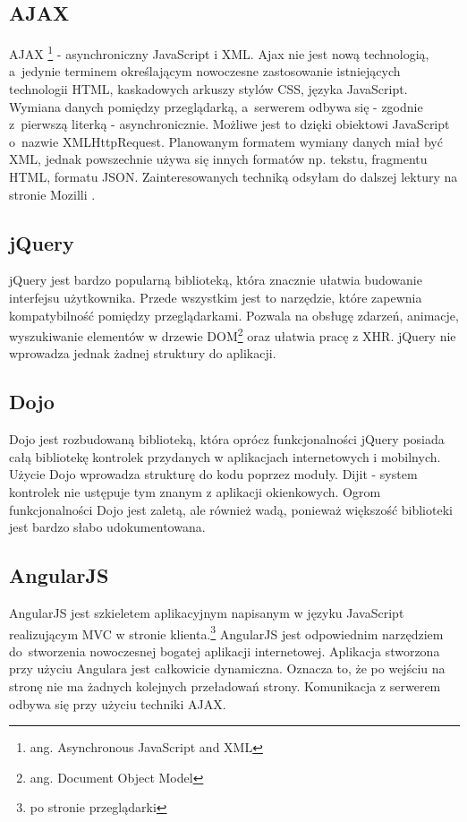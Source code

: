 \documentclass[a4paper,onecolumn,oneside,11pt,wide,floatssmall]{mwrep}
\theoremstyle{definition}
\theoremstyle{plain}%
\theoremstyle{remark}
\begin{document}
\subsection{AJAX}
AJAX \footnote{ang. Asynchronous JavaScript and XML} - asynchroniczny JavaScript i XML. Ajax nie jest nową technologią, \mbox{a jedynie} terminem określającym nowoczesne zastosowanie istniejących technologii HTML, kaskadowych arkuszy stylów CSS, języka JavaScript. Wymiana danych pomiędzy przeglądarką, \mbox{a serwerem} odbywa się - zgodnie \mbox{z pierwszą} literką - asynchronicznie. Możliwe jest to dzięki obiektowi JavaScript \mbox{o nazwie} XMLHttpRequest\cite{XmlHttpRequest}. Planowanym formatem wymiany danych miał być XML, jednak powszechnie używa się innych formatów np. tekstu, fragmentu HTML, formatu JSON. Zainteresowanych techniką odsyłam do dalszej lektury na stronie Mozilli \cite{ajaxDocs}.

\subsection{jQuery}
jQuery jest bardzo popularną biblioteką, która znacznie ułatwia budowanie interfejsu użytkownika. Przede wszystkim jest to narzędzie, które zapewnia kompatybilność pomiędzy przeglądarkami. Pozwala na obsługę zdarzeń, animacje, wyszukiwanie elementów w drzewie DOM\footnote{ang. Document Object Model} oraz ułatwia pracę z XHR. jQuery nie wprowadza jednak żadnej struktury do aplikacji.

\subsection{Dojo}
Dojo jest rozbudowaną biblioteką, która oprócz funkcjonalności jQuery posiada całą bibliotekę kontrolek przydanych w aplikacjach internetowych i mobilnych. Użycie Dojo wprowadza strukturę do kodu poprzez moduły. Dijit - system kontrolek nie ustępuje tym znanym z aplikacji okienkowych. Ogrom funkcjonalności Dojo jest zaletą, ale również wadą, ponieważ większość biblioteki jest bardzo słabo udokumentowana.

\subsection{AngularJS}
AngularJS \cite{angularHome} jest szkieletem aplikacyjnym napisanym w języku JavaScript realizującym MVC w stronie klienta.\footnote{po stronie przeglądarki} AngularJS jest odpowiednim narzędziem \mbox{do stworzenia} nowoczesnej bogatej aplikacji internetowej. Aplikacja stworzona przy użyciu Angulara jest całkowicie dynamiczna. Oznacza to, że po wejściu na stronę nie ma żadnych kolejnych przeładowań strony. Komunikacja z serwerem odbywa się przy użyciu techniki AJAX.
\end{document}
